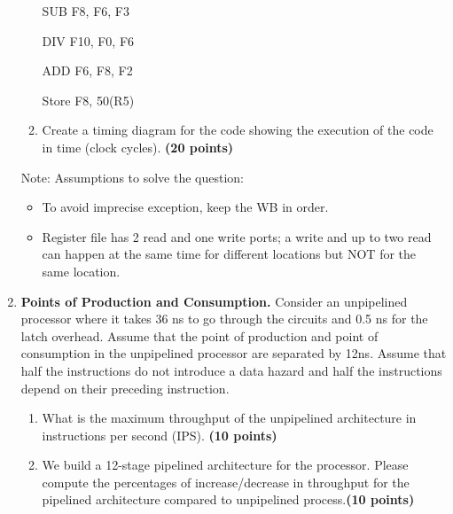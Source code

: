 \documentclass[a4paper, 11pt]{exam}
\begin{document}
\begin{enumerate}
\begin{enumerate}
\begin {center}
SUB F8, F6, F3

DIV F10, F0, F6

ADD F6, F8, F2

Store F8, 50(R5)

\end {center}

\item Create a timing diagram for the code showing the execution of the code in time (clock cycles). \textbf{(20 points)}


\end{enumerate}
Note:  Assumptions to solve the question:
%
\begin{itemize}
	\item To avoid imprecise exception, keep the WB in order.
	\item  Register file has 2 read and one write ports; a write and up to two read can happen at the same time for different locations but NOT for the same location.
\end{itemize}



\item \textbf{Points of Production and Consumption.}
Consider an unpipelined processor where it takes 36 ns to go through the circuits and 0.5 ns for the latch overhead. Assume that the point of production and point of consumption in the unpipelined processor are separated by 12ns. Assume that half the instructions do not introduce a data hazard and half the instructions depend on their preceding instruction.

\begin{enumerate}
\item What is the maximum throughput of the unpipelined architecture in instructions per second (IPS). \textbf{(10 points)}


\item We build a 12-stage pipelined architecture for the processor. Please compute the percentages of increase/decrease in throughput for the pipelined architecture compared to unpipelined process.\textbf {(10 points)}




\end{enumerate}
\end{enumerate}
\end{document}
